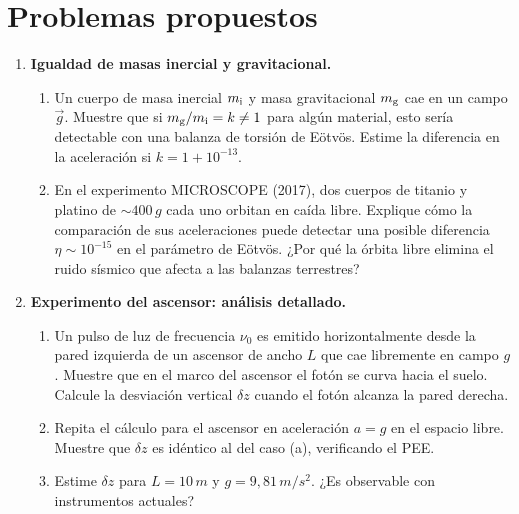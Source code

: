 \section{Problemas propuestos}
\label{sec:problemas_cap5}

\begin{enumerate}[leftmargin=2em, label=\textbf{P\thechapter.\arabic*.}]

  \item \textbf{Igualdad de masas inercial y gravitacional.}
  \begin{enumerate}[label=(\alph*)]
    \item Un cuerpo de masa inercial $m_{\rm i}$ y masa gravitacional $m_{\rm g}$ cae en un campo $\vec{g}$. Muestre que si $m_{\rm g}/m_{\rm i} = k \neq 1$ para algún material, esto sería detectable con una balanza de torsión de Eötvös. Estime la diferencia en la aceleración si $k = 1 + 10^{-13}$.
    \item En el experimento MICROSCOPE (2017), dos cuerpos de titanio y platino de $\sim 400\,\si{g}$ cada uno orbitan en caída libre. Explique cómo la comparación de sus aceleraciones puede detectar una posible diferencia $\eta \sim 10^{-15}$ en el parámetro de Eötvös. ¿Por qué la órbita libre elimina el ruido sísmico que afecta a las balanzas terrestres?
  \end{enumerate}

  \item \textbf{Experimento del ascensor: análisis detallado.}
  \begin{enumerate}[label=(\alph*)]
    \item Un pulso de luz de frecuencia $\nu_0$ es emitido horizontalmente desde la pared izquierda de un ascensor de ancho $L$ que cae libremente en campo $g$. Muestre que en el marco del ascensor el fotón se curva hacia el suelo. Calcule la desviación vertical $\delta z$ cuando el fotón alcanza la pared derecha.
    \item Repita el cálculo para el ascensor en aceleración $a = g$ en el espacio libre. Muestre que $\delta z$ es idéntico al del caso (a), verificando el PEE.
    \item Estime $\delta z$ para $L = 10\,\si{m}$ y $g = 9{,}81\,\si{m/s^2}$. ¿Es observable con instrumentos actuales?
  \end{enumerate}


\end{enumerate}
